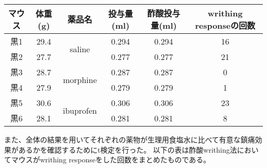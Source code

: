 \documentclass[a4paper,papersize,dvipdfmx]{jsarticle}
\begin{document}
\begin{table}[H]
\centering
\begin{tabular}{|c|c|c|c|c|c|}
\hline
マウス & 体重(g) & 薬品名                        & 投与量(ml) & 酢酸投与量(ml) & writhing responseの回数 \\ \hline
黒1  & 29.4  & \multirow{2}{*}{saline}    & 0.294   & 0.294     & 16                   \\ \cline{1-2} \cline{4-6}
黒2  & 27.7  &                            & 0.277   & 0.277     & 21                   \\ \hline
黒3  & 28.7  & \multirow{2}{*}{morphine}  & 0.287   & 0.287     & 0                    \\ \cline{1-2} \cline{4-6}
黒4  & 27.9  &                            & 0.279   & 0.279     & 1                    \\ \hline
黒5  & 30.6  & \multirow{2}{*}{ibuprofen} & 0.306   & 0.306     & 23                   \\ \cline{1-2} \cline{4-6}
黒6  & 28.1  &                            & 0.281   & 0.281     & 8                    \\ \hline
\end{tabular}
\end{table}

また、全体の結果を用いてそれぞれの薬物が生理用食塩水に比べて有意な鎮痛効果があるかを確認するためにt検定を行った。
以下の表は酢酸writhing法においてマウスがwrithing responseをした回数をまとめたものである。
\end{document}
